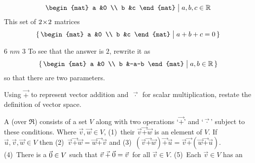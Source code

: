 \begin{exercises}
\begin{exparts}
\begin{equation*}
{\begin{mat}
            a  &0  \\
            b  &c
          \end{mat} \suchthat a,b,c\in\Re}
        \end{equation*}
      \partsitem This set of \( 2 \! \times \! 2 \) matrices
        \begin{equation*}
          \set{\begin{mat}
            a  &0  \\
            b  &c
          \end{mat} \suchthat a+b+c=0}
        \end{equation*}
    \end{exparts}
    \begin{answer}
      \begin{exparts}
        \partsitem \( 6 \)
        \partsitem \( nm \)
        \partsitem \( 3 \)
        \partsitem To see that the answer is \( 2 \), rewrite it as
        \begin{equation*}
          \set{\begin{mat}
            a  &0  \\
            b  &-a-b
          \end{mat} \suchthat a,b\in\Re}
        \end{equation*}
        so that there are two parameters.
      \end{exparts}  
     \end{answer}
  \recommended \item 
    Using \( \vec{+} \) to represent vector addition
    and \( \,\vec{\cdot}\, \) for scalar multiplication,
    restate the definition of vector space.
    \begin{answer}
      {
      \def\plus{\mathbin{\vec{+}}}
      \def\tim{\mathbin{\vec{\cdot}}}
        A 
        (over \( \Re \)) consists of a set \( V \) along with
        two operations `\( \plus \)' and `\( \tim \)' subject to these 
        conditions.
        Where \( \vec{v},\vec{w}\in V \), 
        (1)~their 
          \( \vec{v}\plus\vec{w} \) is an element of \( V \).
        If \( \vec{u},\vec{v},\vec{w}\in V \) then 
        (2)~\( \vec{v}\plus\vec{w}=\vec{w}\plus\vec{v} \) and 
        (3)~\( (\vec{v}\plus\vec{w})\plus\vec{u}
                 =\vec{v}\plus(\vec{w}\plus\vec{u}) \).
        (4)~There is a 
          \( \vec{0}\in V \) such that
          \( \vec{v}\plus\zero=\vec{v}\, \) for all \( \vec{v}\in V\).
        (5)~Each \( \vec{v}\in V \) has an
}
\end{answer}
\end{exercises}
